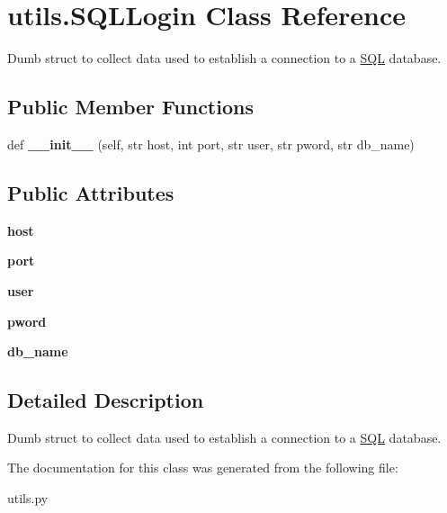 \hypertarget{classutils_1_1_s_q_l_login}{}\section{utils.\+S\+Q\+L\+Login Class Reference}
\label{classutils_1_1_s_q_l_login}


Dumb struct to collect data used to establish a connection to a \mbox{\hyperlink{classutils_1_1_s_q_l}{S\+QL}} database.  


\subsection*{Public Member Functions}
\begin{DoxyCompactItemize}
\item 
\mbox{\label{classutils_1_1_s_q_l_login_a4d61e368f0532bdd2117c8fd85904d8b}} 
def {\bfseries \+\_\+\+\_\+init\+\_\+\+\_\+} (self, str host, int port, str user, str pword, str db\+\_\+name)
\end{DoxyCompactItemize}
\subsection*{Public Attributes}
\begin{DoxyCompactItemize}
\item 
\mbox{\label{classutils_1_1_s_q_l_login_a50570315e91732075bd57aa06ed5fa43}} 
{\bfseries host}
\item 
\mbox{\label{classutils_1_1_s_q_l_login_a5c937b5a3171bad6366fed5f521c2fb5}} 
{\bfseries port}
\item 
\mbox{\label{classutils_1_1_s_q_l_login_a145025607e873364d715f674fd096e20}} 
{\bfseries user}
\item 
\mbox{\label{classutils_1_1_s_q_l_login_ab9816e698e4d83511321310d913fbd6d}} 
{\bfseries pword}
\item 
\mbox{\label{classutils_1_1_s_q_l_login_a7a3f9f2f8195e5a8d7e068756f00f206}} 
{\bfseries db\+\_\+name}
\end{DoxyCompactItemize}


\subsection{Detailed Description}
Dumb struct to collect data used to establish a connection to a \mbox{\hyperlink{classutils_1_1_s_q_l}{S\+QL}} database. 



The documentation for this class was generated from the following file\+:\begin{DoxyCompactItemize}
\item 
utils.\+py\end{DoxyCompactItemize}
